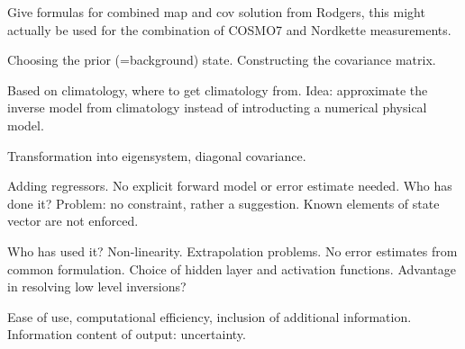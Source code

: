         Give formulas for combined map and cov solution from Rodgers, this
        might actually be used for the combination of COSMO7 and Nordkette
        measurements.
        
    \stopsubsection

    \startsubsection[title={Constructing the Prior},reference=ch:construct_prior]

        Choosing the prior (=background) state. Constructing the covariance
        matrix.

    \stopsubsection

\stopsection


\startsection[title=Linear Regression]

    Based on climatology, where to get climatology from. Idea: approximate
    the inverse model from climatology instead of introducting a numerical
    physical model.

    \startsubsection[title=Quantifying Uncertainty]

        Transformation into eigensystem, diagonal covariance.

    \stopsubsection

    \startsubsection[title=Including Additional Information]

        Adding regressors. No explicit forward model or error estimate needed.
        Who has done it? Problem: no constraint, rather a suggestion. Known
        elements of state vector are not enforced.

    \stopsubsection
    
\stopsection


\startsection[title=Neural Network Regression]

    Who has used it? Non-linearity. Extrapolation problems. No error estimates
    from common formulation. Choice of hidden layer and activation functions.
    Advantage in resolving low level inversions?

\stopsection


\startsection[title=Comparison of Techniques]

    Ease of use, computational efficiency, inclusion of additional information.
    Information content of output: uncertainty.

\stopsection

